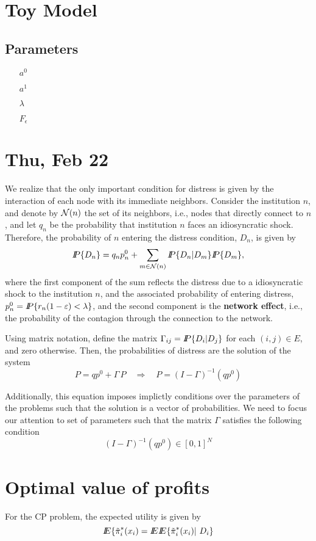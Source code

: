 \section{Toy Model}

\subsection{Parameters}
\begin{itemize}
\item[$a^0$]
\item[$a^1$]
\item[$\lambda$]
\item[$F_\epsilon$]
\end{itemize}

\section{Thu, Feb 22}
We realize that the only important condition for distress is given by the interaction of each node with its immediate neighbors.  Consider the institution $n$, and denote by ${\cal N}(n)$ the set of its neighbors, i.e., nodes that directly connect to $n$, and let $q_n$ be the probability that institution $n$ faces an idiosyncratic shock.  Therefore, the probability of $n$ entering the distress condition, $D_n$,  is given by
\[{I\kern-.35em P}\{D_n\} = q_n p^0_n+\sum_{m\in {\cal N}(n)} {I\kern-.35em P}\{D_n|D_m\}{I\kern-.35em P}\{D_m\},\]
where the first component of the sum reflects the distress due to a idiosyncratic shock to the institution $n$, and the associated probability of entering distress,  $p^0_n={I\kern-.35em P}\{r_n(1-\varepsilon)<\lambda\}$, and the second component is the {\bf network effect}, i.e., the probability of the contagion through the connection to the network.

Using matrix notation, define the matrix $\Gamma_{ij}={I\kern-.35em P}\{D_i|D_j\}$ for each $(i,j)\in E$, and zero otherwise. Then, the probabilities of distress are the solution of the system
\begin{equation}\label{transprob}
P=qp^0+\Gamma\,P\quad \Rightarrow \quad P=(I-\Gamma)^{-1}(qp^0)
\end{equation}

Additionally, this equation imposes implictly conditions over the parameters of the problems such that the solution is a vector of probabilities.  We need to focus our attention to set of parameters such that the matrix $\Gamma$ satisfies the following condition 
\[(I-\Gamma)^{-1}(qp^0) \in [0,1]^N\]

\section{Optimal value of profits}
For the CP problem, the expected utility is given by
\[{I\kern-.35em E}\{\tilde\pi^*_i(x_i)={I\kern-.35em E} {I\kern-.35em E}\{ \tilde\pi^*_i(x_i)|~D_i\}\]